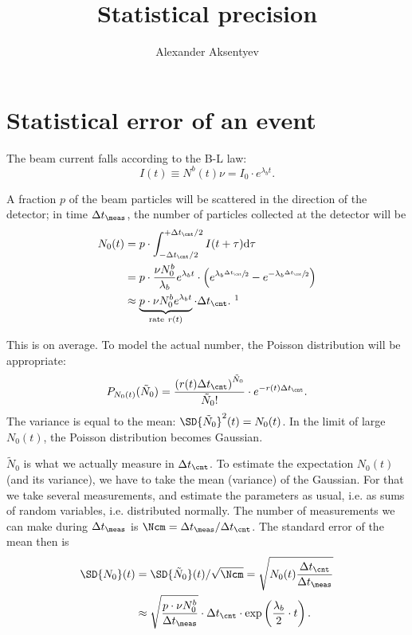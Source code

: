 \documentclass{article}
\newcommand{\dt}{\Delta t}
\newcommand{\dtm}{\dt_{\meas}}
\newcommand{\dtc}{\dt_{\cnt}}
\newcommand{\lamb}{\lambda_b}
\begin{document}
	
\title{Statistical precision}
\author{Alexander Aksentyev}
\date{}
\maketitle
	
		
\section*{Statistical error of an event}

The beam current falls according to the B-L law:
\[
	I(t) \equiv N^b(t)\nu = I_0\cdot e^{\lamb t}.
\]

A fraction $p$ of the beam particles will be scattered in the direction of the detector; in time $\dtm$, the number of particles collected at the detector will be
\begin{align}
	N_0(t) & = p\cdot\int_{-\dtc/2}^{+\dtc/2} I(t+\tau)\td\tau \notag                    \\
	       & = p\cdot\frac{\nu N_0^b}{\lamb} e^{\lamb t}\cdot \bkt{e^{\lamb\sfrac{\dtc}{2}} - e^{-\lamb\sfrac{\dtc}{2}}} \notag \\
	       & \approx \underbrace{p\cdot\nu N_0^b e^{\lamb t}}_{\text{rate}~r(t)} \cdot\dtc.~\footnotemark
\end{align}

This is on average. To model the actual number, the Poisson distribution will be appropriate:
\[
	P_{N_0(t)}(\tilde{N}_0) = \frac{\bkt{r(t)\dtc}^{\tilde{N}_0}}{\tilde{N}_0!}\cdot e^{-r(t)\dtc}.
\]
The variance is equal to the mean: $\SD{\tilde{N}_0}^2(t) = N_0(t)$. In the limit of large $N_0(t)$, the Poisson distribution becomes Gaussian.

$\tilde{N}_0$ is what we actually measure in $\dtc$. To estimate the expectation $N_0(t)$ (and its variance), we have to take the mean (variance) of the Gaussian. For that we take several measurements, and estimate the parameters as usual, i.e. as sums of random variables, i.e. distributed normally. The number of measurements we can make during $\dtm$ is $\Ncm = \dtm/\dtc$. The standard error of the mean then is 
\begin{align}\label{eq:MeasSE}
	\SD{N_0}(t) & = \SD{\tilde{N}_0}(t)/\sqrt{\Ncm} = \sqrt{N_0(t)\frac{\dtc}{\dtm}}            \notag \\
	            & \approx \sqrt{\frac{p\cdot\nu N_0^b}{\dtm}}\cdot\dtc \cdot\exp\bkt{\frac{\lamb}{2}\cdot t}.
\end{align}
\newcommand{\A}{\frac{1}{\sqrt{p\cdot\nu N_0^b}}}
\end{document}
